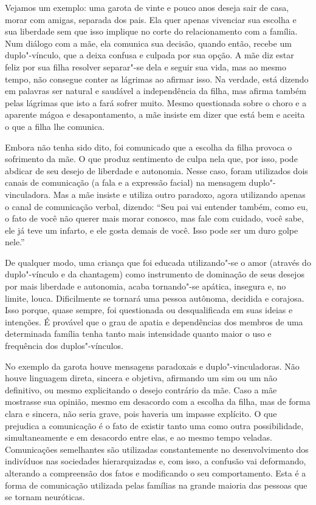 Vejamos um exemplo: uma garota de vinte e pouco anos deseja sair de
casa, morar com amigas, separada dos pais. Ela quer apenas vivenciar sua
escolha e sua liberdade sem que isso implique no corte do relacionamento
com a família. Num diálogo com a mãe, ela comunica sua decisão, quando
então, recebe um duplo"-vínculo, que a deixa confusa e culpada por sua
opção. A mãe diz estar feliz por sua filha resolver separar"-se dela e
seguir sua vida, mas ao mesmo tempo, não consegue conter as lágrimas ao
afirmar isso. Na verdade, está dizendo em palavras ser natural e
saudável a independência da filha, mas afirma também pelas lágrimas que
isto a fará sofrer muito. Mesmo questionada sobre o choro e a aparente
mágoa e desapontamento, a mãe insiste em dizer que está bem e aceita o
que a filha lhe comunica.

Embora não tenha sido dito, foi comunicado que a escolha da filha
provoca o sofrimento da mãe. O que produz sentimento de culpa nela que,
por isso, pode abdicar de seu desejo de liberdade e autonomia. Nesse
caso, foram utilizados dois canais de comunicação (a fala e a expressão
facial) na mensagem duplo"-vinculadora. Mas a mãe insiste e utiliza outro
paradoxo, agora utilizando apenas o canal de comunicação verbal,
dizendo: ``Seu pai vai entender também, como eu, o fato de você não
querer mais morar conosco, mas fale com cuidado, você sabe, ele já teve
um infarto, e ele gosta demais de você. Isso pode ser um duro golpe
nele.''

De qualquer modo, uma criança que foi educada utilizando"-se o amor
(através do duplo"-vínculo e da chantagem) como instrumento de dominação
de seus desejos por mais liberdade e autonomia, acaba tornando"-se
apática, insegura e, no limite, louca. Dificilmente se tornará uma pessoa
autônoma, decidida e corajosa. Isso porque, quase sempre, foi
questionada ou desqualificada em suas ideias e intenções. É provável que
o grau de apatia e dependências dos membros de uma determinada família
tenha tanto mais intensidade quanto maior o uso e frequência dos duplos"-vínculos.

No exemplo da garota houve mensagens paradoxais e duplo"-vinculadoras.
Não houve linguagem direta, sincera e objetiva, afirmando um sim ou um
não definitivo, ou mesmo explicitando o desejo contrário da mãe. Caso a
mãe mostrasse sua opinião, mesmo em desacordo com a escolha da filha,
mas de forma clara e sincera, não seria grave, pois haveria um impasse
explícito. O que prejudica a comunicação é o fato de existir tanto uma
como outra possibilidade, simultaneamente e em desacordo entre elas, e
ao mesmo tempo veladas. Comunicações semelhantes são utilizadas
constantemente no desenvolvimento dos indivíduos nas sociedades
hierarquizadas e, com isso, a confusão vai deformando, alterando a
compreensão dos fatos e modificando o seu comportamento. Esta é a forma
de comunicação utilizada pelas famílias na grande maioria das pessoas
que se tornam neuróticas.

